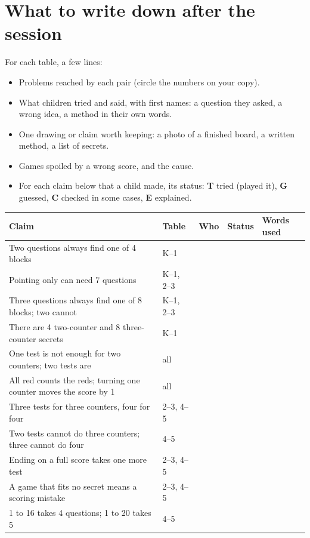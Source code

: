 \documentclass[11pt]{article}
\renewcommand{\arraystretch}{1.15}
\begin{document}
\section{What to write down after the session}

For each table, a few lines:
\begin{itemize}
\item Problems reached by each pair (circle the numbers on your copy).
\item What children tried and said, with first names: a question they asked, a wrong idea, a method in their own words.
\item One drawing or claim worth keeping: a photo of a finished board, a written method, a list of secrets.
\item Games spoiled by a wrong score, and the cause.
\item For each claim below that a child made, its status: \textbf{T} tried (played it), \textbf{G} guessed, \textbf{C} checked in some cases, \textbf{E} explained.
\end{itemize}

{\small\renewcommand{\arraystretch}{1.55}
\begin{tabularx}{\linewidth}{@{}L l p{0.8in} p{0.45in} p{1.45in}@{}}
\toprule
Claim & Table & Who & Status & Words used\\
\midrule
Two questions always find one of 4 blocks & K--1 & & & \\
\midrule[0.3pt]
Pointing only can need 7 questions & K--1, 2--3 & & & \\
\midrule[0.3pt]
Three questions always find one of 8 blocks; two cannot & K--1, 2--3 & & & \\
\midrule[0.3pt]
There are 4 two-counter and 8 three-counter secrets & K--1 & & & \\
\midrule[0.3pt]
One test is not enough for two counters; two tests are & all & & & \\
\midrule[0.3pt]
All red counts the reds; turning one counter moves the score by 1 & all & & & \\
\midrule[0.3pt]
Three tests for three counters, four for four & 2--3, 4--5 & & & \\
\midrule[0.3pt]
Two tests cannot do three counters; three cannot do four & 4--5 & & & \\
\midrule[0.3pt]
Ending on a full score takes one more test & 2--3, 4--5 & & & \\
\midrule[0.3pt]
A game that fits no secret means a scoring mistake & 2--3, 4--5 & & & \\
\midrule[0.3pt]
1 to 16 takes 4 questions; 1 to 20 takes 5 & 4--5 & & & \\
\bottomrule
\end{tabularx}}
\end{document}
